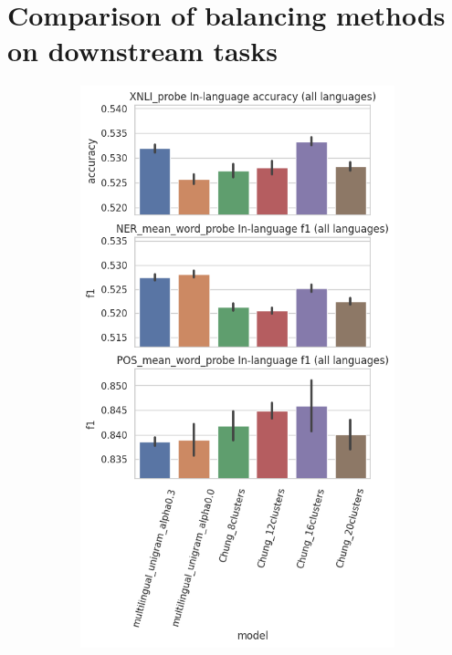 \section{Comparison of balancing methods on downstream tasks}


\begin{figure}
    \centering
    \begin{subfigure}{.5\textwidth}
      \centering
      \includegraphics[width=\linewidth]{img/temp/probe_overall_inlanguage.png}

\end{subfigure}
\end{figure}
